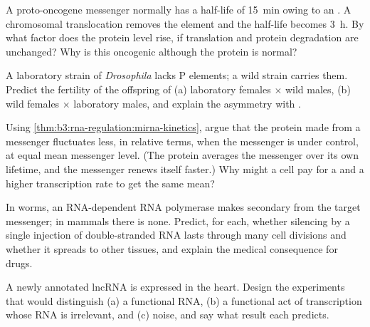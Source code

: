 \begin{exercise}[$\star\star$]\label{exo:b3:rna-regulation:8}
A proto-oncogene messenger normally has a half-life of \qty{15}{min}
owing to an . A chromosomal translocation removes the
element and the half-life becomes \qty{3}{h}. By what factor does the
protein level rise, if translation and protein degradation are
unchanged? Why is this oncogenic although the protein is normal?
\end{exercise}

\begin{exercise}[$\star\star$]\label{exo:b3:rna-regulation:9}
A laboratory strain of \emph{Drosophila} lacks P elements; a wild
strain carries them. Predict the fertility of the offspring of
(a) laboratory females $\times$ wild males, (b) wild females $\times$
laboratory males, and explain the asymmetry with .
\end{exercise}

\begin{exercise}[$\star\star\star$]\label{exo:b3:rna-regulation:10}
Using \cref{thm:b3:rna-regulation:mirna-kinetics}, argue that the
protein made from a messenger fluctuates less, in relative terms, when
the messenger is under  control, at equal mean messenger level.
(The protein averages the messenger over its own lifetime, and the
messenger renews itself faster.) Why might a cell pay for a 
and a higher transcription rate to get the same mean?
\end{exercise}

\begin{exercise}[$\star\star\star$]\label{exo:b3:rna-regulation:11}
In worms, an RNA-dependent RNA polymerase makes secondary  from
the target messenger; in mammals there is none. Predict, for each,
whether silencing by a single injection of double-stranded RNA lasts
through many cell divisions and whether it spreads to other tissues,
and explain the medical consequence for  drugs.
\end{exercise}

\begin{exercise}[$\star\star\star$]\label{exo:b3:rna-regulation:12}
A newly annotated lncRNA is expressed in the heart. Design the
experiments that would distinguish (a) a functional RNA, (b) a
functional act of transcription whose RNA is irrelevant, and (c) noise,
and say what result each predicts.
\end{exercise}

